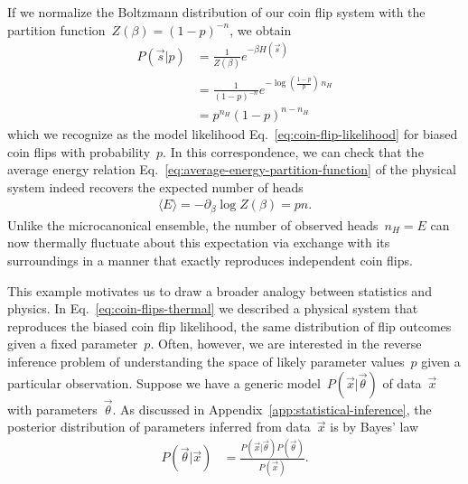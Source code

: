 If we normalize the Boltzmann distribution of our coin flip system with the partition function~$Z(\beta) = (1-p)^{-n}$, we obtain \begin{align}
    P(\vec{s}|p) &= \frac{1}{Z(\beta)} e^{-\beta H(\vec{s})} \nonumber \\
    &= \frac{1}{(1 - p)^{-n}} e^{-\log \left(\frac{1-p}{p}\right) \, n_H} \nonumber \\
    &= p^{n_H}(1-p)^{n - n_H} \label{eq:coin-flips-thermal}
\end{align}
which we recognize as the model likelihood Eq.~\eqref{eq:coin-flip-likelihood} for biased coin flips with probability~$p$. In this correspondence, we can check that the average energy relation Eq.~\eqref{eq:average-energy-partition-function} of the physical system indeed recovers the expected number of heads \begin{align}
    \langle E \rangle = -\partial_\beta \log Z(\beta) = p n.
\end{align} Unlike the microcanonical ensemble, the number of observed heads~$n_H = E$ can now thermally fluctuate about this expectation via exchange with its surroundings in a manner that exactly reproduces independent coin flips.

This example motivates us to draw a broader analogy between statistics and physics. In Eq.~\eqref{eq:coin-flips-thermal} we described a physical system that reproduces the biased coin flip likelihood, the same distribution of flip outcomes given a fixed parameter~$p$. Often, however, we are interested in the reverse inference problem of understanding the space of likely parameter values~$p$ given a particular observation. Suppose we have a generic model~$P(\vec{x}|\vec{\theta})$ of data~$\vec{x}$ with parameters~$\vec{\theta}$. As discussed in Appendix~\ref{app:statistical-inference}, the posterior distribution of parameters inferred from data~$\vec{x}$ is by Bayes' law \begin{align}
    P(\vec{\theta}|\vec{x}) &= \frac{P(\vec{x}|\vec{\theta})P(\vec{\theta})}{P(\vec{x})}.
\end{align}

